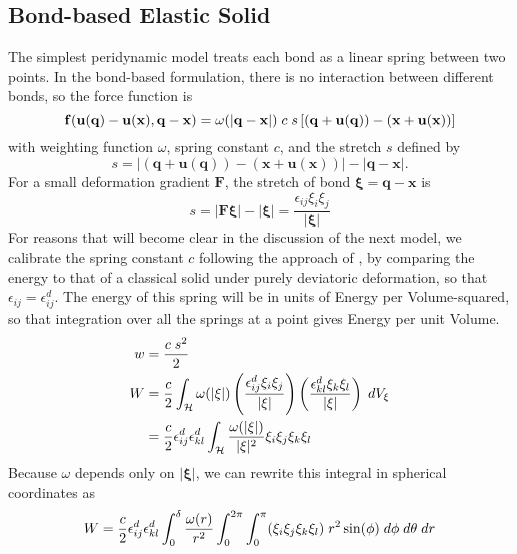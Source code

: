 \subsection{Bond-based Elastic Solid}
The simplest peridynamic model treats each bond as a linear spring between two points.
In the bond-based formulation, there is no interaction between different bonds, so the force function is
%
\begin{equation}
\mathit{\mathbf{f}}(\mathbf{u}(\mathbf{q})-\mathbf{u}(\mathbf{x}),\mathbf{q}-\mathbf{x}) = \omega(|\mathbf{q}-\mathbf{x}|)\;c\;s \left[(\mathbf{q}+\mathbf{u}(\mathbf{q}))-(\mathbf{x}+\mathbf{u}(\mathbf{x}))\right]
\end{equation}
%
with weighting function $\omega$, spring constant $c$, and the stretch $s$ defined by
%
\begin{equation}
\label{eq:stretch}
s = |(\mathbf{q}+\mathbf{u}(\mathbf{q}))-(\mathbf{x}+\mathbf{u}(\mathbf{x}))| - |\mathbf{q}-\mathbf{x}|.
\end{equation}
%
For a small deformation gradient $\mathbf{F}$, the stretch of bond $\boldsymbol{\xi}=\mathbf{q}-\mathbf{x}$ is
%
\begin{equation*}
s = |\mathbf{F}\boldsymbol{\xi}|-|\boldsymbol{\xi}| = \frac{\epsilon_{ij}\xi_i\xi_j}{|\boldsymbol{\xi}|}
\end{equation*}
%
For reasons that will become clear in the discussion of the next model, we calibrate the spring constant $c$ following the approach of \cite{silling2007peridynamic}, by comparing the energy to that of a classical solid under purely deviatoric deformation, so that $\epsilon_{ij} = \epsilon_{ij}^d$.
The energy of this spring will be in units of Energy per Volume-squared, so that integration over all the springs at a point gives Energy per unit Volume.
%
\begin{align}
\label{eq:deviatoricStrainEnergy}
w &= \frac{c\;s^2}{2}\notag \\
W &= \frac{c}{2}\int_\mathcal{H} \omega(|\xi|)\left( \frac{\epsilon_{ij}^d\xi_i\xi_j}{|\xi|} \right)\left( \frac{\epsilon_{kl}^d\xi_k\xi_l}{|\xi|} \right)\;dV_\xi\notag\\
&= \frac{c}{2}\epsilon_{ij}^d \epsilon_{kl}^d \int_\mathcal{H} \frac{\omega(|\xi|)}{|\xi|^2}\xi_i\xi_j\xi_k\xi_l 
\end{align}
%
Because $\omega$ depends only on $|\boldsymbol{\xi}|$, we can rewrite this integral in spherical coordinates as
%
\begin{equation}
W= \frac{c}{2}\epsilon_{ij}^d \epsilon_{kl}^d \int_0^\delta \frac{\omega(r)}{r^2}\int_0^{2\pi}\int_0^\pi (\xi_i\xi_j\xi_k\xi_l)\;r^2 \sin(\phi)\;d\phi\;d\theta\;dr\notag
\end{equation}
